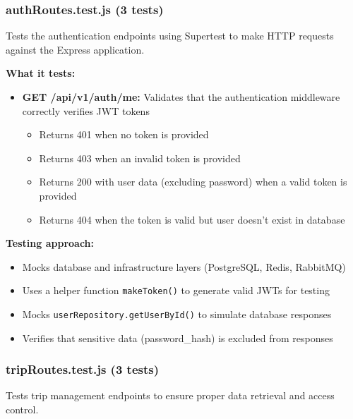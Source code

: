 \subsubsection{authRoutes.test.js (3 tests)}
\label{subsubsec:auth_routes_test}

Tests the authentication endpoints using Supertest to make HTTP requests against the Express application.

\textbf{What it tests:}
\begin{itemize}
    \item \textbf{GET /api/v1/auth/me:} Validates that the authentication middleware correctly verifies JWT tokens
    \begin{itemize}
        \item Returns 401 when no token is provided
        \item Returns 403 when an invalid token is provided  
        \item Returns 200 with user data (excluding password) when a valid token is provided
        \item Returns 404 when the token is valid but user doesn't exist in database
    \end{itemize}
\end{itemize}

\textbf{Testing approach:}
\begin{itemize}
    \item Mocks database and infrastructure layers (PostgreSQL, Redis, RabbitMQ)
    \item Uses a helper function \texttt{makeToken()} to generate valid JWTs for testing
    \item Mocks \texttt{userRepository.getUserById()} to simulate database responses
    \item Verifies that sensitive data (password\_hash) is excluded from responses
\end{itemize}

\subsubsection{tripRoutes.test.js (3 tests)}
\label{subsubsec:trip_routes_test}

Tests trip management endpoints to ensure proper data retrieval and access control.

